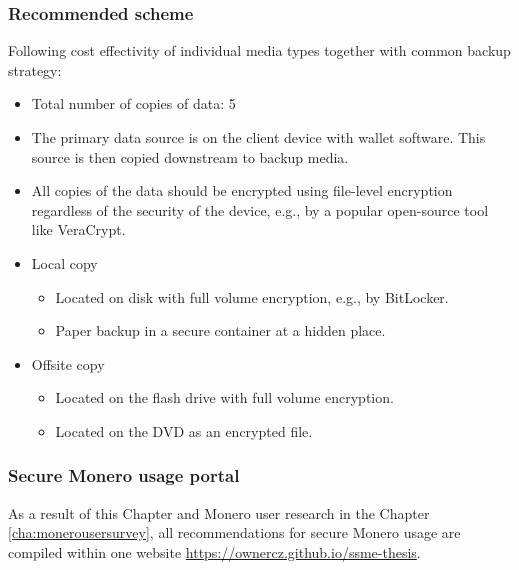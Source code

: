 \documentclass[
  printed, %
  table,   %
  lof,     %
  lot,     %
           oneside, color
]{fithesis3}
\begin{document}
\subsubsection{Recommended scheme}
Following cost effectivity of individual media types together with common backup strategy:
\begin{itemize}
\itemsep0em
\item Total number of copies of data: 5
\item The primary data source is on the client device with wallet software. This source is then copied downstream to backup media.
\item All copies of the data should be encrypted using file-level encryption regardless of the security of the device, e.g., by a popular open-source tool like VeraCrypt.
\item Local copy
\begin{itemize}
\itemsep0em
\item Located on disk with full volume encryption, e.g., by BitLocker.
\item Paper backup in a secure container at a hidden place.
\end{itemize}
\item Offsite copy
\begin{itemize}
\itemsep0em
\item Located on the flash drive with full volume encryption.
\item Located on the DVD as an encrypted file.
\end{itemize}
\end{itemize}

\subsubsection{Secure Monero usage portal}
As a result of this Chapter and Monero user research in the Chapter \ref{cha:monerousersurvey}, all recommendations for secure Monero usage are compiled within one website \url{https://ownercz.github.io/ssme-thesis}.

\end{document}
